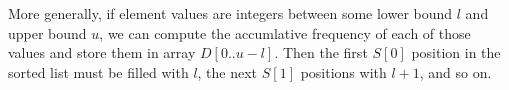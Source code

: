 \documentclass[preview]{standalone}
\begin{document}
\begin{center}
More generally, if element values are integers between some lower bound $l$ and upper bound $u$, we can compute the accumlative frequency of each of those values and store them in array $D[0..u - l]$. Then the first $S[0]$ position in the sorted list must be filled with $l$, the next $S[1]$ positions with $l + 1$, and so on.
\end{center}
\end{document}
